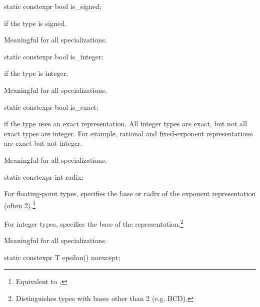 %
\begin{itemdecl}
static constexpr bool is_signed;
\end{itemdecl}

\begin{itemdescr}
\pnum
{} if the type is signed.

\pnum
Meaningful for all specializations.
\end{itemdescr}

%
\begin{itemdecl}
static constexpr bool is_integer;
\end{itemdecl}

\begin{itemdescr}
\pnum
{} if the type is integer.

\pnum
Meaningful for all specializations.
\end{itemdescr}

%
\begin{itemdecl}
static constexpr bool is_exact;
\end{itemdecl}

\begin{itemdescr}
\pnum
{} if the type uses an exact representation.
All integer types are exact, but not all exact types are integer.
For example, rational and fixed-exponent representations are exact but not integer.

\pnum
Meaningful for all specializations.
\end{itemdescr}

%
\begin{itemdecl}
static constexpr int radix;
\end{itemdecl}

\begin{itemdescr}
\pnum
For floating-point types, specifies the base or radix of the exponent representation
(often 2).\footnote{Equivalent to .}

\pnum
For integer types, specifies the base of the
representation.\footnote{Distinguishes types with bases other than 2 (e.g.
BCD).}

\pnum
Meaningful for all specializations.
\end{itemdescr}

%
\begin{itemdecl}
static constexpr T epsilon() noexcept;
\end{itemdecl}

